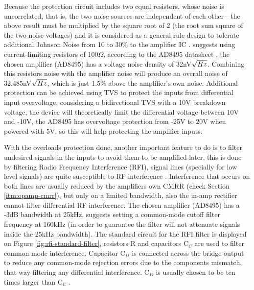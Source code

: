 	Because the protection circuit includes two equal resistors, whose noise is uncorrelated, that is, the two noise sources are independent of each other—the above result must be multiplied by the square root of 2 (the root sum square of the two noise voltages) and it is considered as a general rule design to tolerate additional Johnson Noise from 10 to 30$\%$ to the amplifier IC \cite{sensors2000}. \cite{two-ways-thermocouple} suggests using current-limiting resistors of 100$\Omega$, according to the AD8495 datasheet \cite{ad8495-datasheet}, the chosen amplifier (AD8495) has a voltage noise density of 32nV$\/ \sqrt{Hz}$. Combining this resistors noise with the amplifier noise will produce an overall noise of 32.485nV$\/\sqrt{Hz}$, which is just 1.5$\%$ above the amplifier's own noise. Additional protection can be achieved using TVS to protect the inputs from differential input overvoltage, considering a bidirectional TVS with a 10V breakdown voltage, the device will theoretically limit the differential voltage between 10V and -10V, the AD8495 has overvoltage protection from -25V to 20V when powered with 5V, so this will help protecting the amplifier inputs. 
	\par
	With the overloads protection done, another important feature to do is to filter undesired signals in the inputs to avoid them to be amplified later, this is done by filtering Radio Frequency Interference (RFI), signal lines (specially for low level signals) are quite susceptible to RF interference \cite{analogDevDesignersGuide}. Interference that occurs on both lines are usually reduced by the amplifiers own CMRR (check Section \ref{itm:opamp-cmrr}), but only on a limited bandwidth, also the in-amp rectifier cannot filter differential RF interference. The chosen amplifier (AD8495) has a -3dB bandwidth at 25kHz, \cite{two-ways-thermocouple} suggests setting a common-mode cutoff filter frequency at 160kHz (in order to guarantee the filter will not attenuate signals inside the 25kHz bandwidth). The standard circuit for the RFI filter is displayed on Figure \ref{fig:rfi-standard-filter}, resistors R and capacitors C$_{C}$ are used to filter common-mode interference. Capacitor C$_{D}$ is connected across the bridge output to reduce any common-mode rejection errors due to the components mismatch, that way filtering any differential interference. C$_{D}$ is usually chosen to be ten times larger than C$_{C}$ \cite{ad8495-datasheet}.
	

